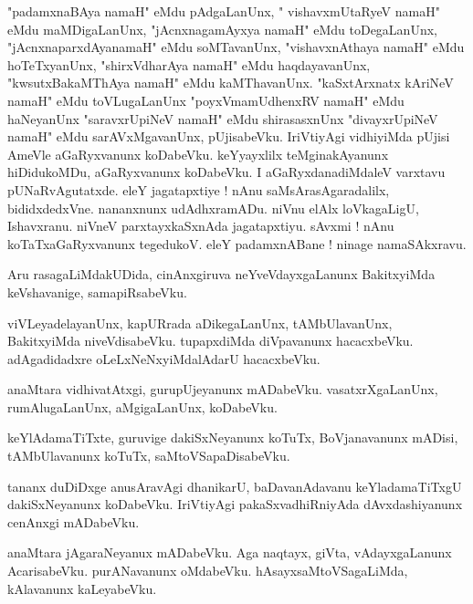\documentclass{article}
\begin{document}
\begin{mn}%
"padamxnaBAya namaH" eMdu pAdgaLanUnx, " vishavxmUtaRyeV namaH" eMdu maMDigaLanUnx, 
"jAcnxnagamAyxya namaH" eMdu toDegaLanUnx, "jAcnxnaparxdAyanamaH" eMdu soMTavanUnx, 
"vishavxnAthaya namaH" eMdu hoTeTxyanUnx, "shirxVdharAya namaH" eMdu haqdayavanUnx, 
"kwsutxBakaMThAya namaH" eMdu kaMThavanUnx. "kaSxtArxnatx kAriNeV namaH"  eMdu toVLugaLanUnx 
"poyxVmamUdhenxRV namaH" eMdu haNeyanUnx "saravxrUpiNeV namaH" eMdu shirasasxnUnx "divayxrUpiNeV 
namaH" eMdu sarAVxMgavanUnx, pUjisabeVku. IriVtiyAgi vidhiyiMda pUjisi AmeVle aGaRyxvanunx 
koDabeVku. keYyayxlilx teMginakAyanunx hiDidukoMDu, aGaRyxvanunx koDabeVku. I aGaRyxdanadiMdaleV 
varxtavu pUNaRvAgutatxde. eleY jagatapxtiye ! nAnu saMsArasAgaradalilx, bididxdedxVne. nananxnunx 
udAdhxramADu. niVnu elAlx loVkagaLigU, Ishavxranu. niVneV parxtayxkaSxnAda jagatapxtiyu. sAvxmi ! 
nAnu koTaTxaGaRyxvanunx tegedukoV. eleY padamxnABane ! ninage namaSAkxravu.
\end{mn}

\begin{mn}%
Aru rasagaLiMdakUDida, cinAnxgiruva neYveVdayxgaLanunx BakitxyiMda keVshavanige, samapiRsabeVku.
\end{mn}

\begin{mn}%
viVLeyadelayanUnx, kapURrada aDikegaLanUnx, tAMbUlavanUnx, BakitxyiMda niveVdisabeVku. tupapxdiMda 
diVpavanunx hacacxbeVku. adAgadidadxre oLeLxNeNxyiMdalAdarU hacacxbeVku.
\end{mn}

\begin{mn}%
anaMtara vidhivatAtxgi, gurupUjeyanunx mADabeVku. vasatxrXgaLanUnx, rumAlugaLanUnx, aMgigaLanUnx, 
koDabeVku.
\end{mn}

\begin{mn}%
keYlAdamaTiTxte, guruvige dakiSxNeyanunx koTuTx, BoVjanavanunx mADisi, tAMbUlavanunx koTuTx, 
saMtoVSapaDisabeVku.
\end{mn}

\begin{mn}%
tananx duDiDxge anusAravAgi dhanikarU, baDavanAdavanu keYladamaTiTxgU dakiSxNeyanunx koDabeVku. 
IriVtiyAgi pakaSxvadhiRniyAda dAvxdashiyanunx cenAnxgi mADabeVku.
\end{mn}

\begin{mn}%
anaMtara jAgaraNeyanux mADabeVku. Aga naqtayx, giVta, vAdayxgaLanunx AcarisabeVku. purANavanunx 
oMdabeVku. hAsayxsaMtoVSagaLiMda, kAlavanunx kaLeyabeVku.
\end{mn}
\end{document}
